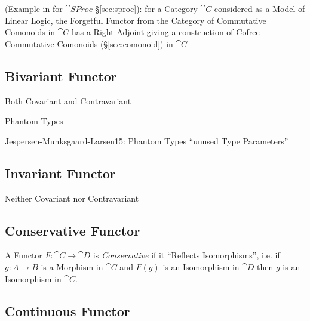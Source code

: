 (Example in \cite{abramsky-gay-nagarajan96} for $\cat{SProc}$
\S\ref{sec:sproc}): for a Category $\cat{C}$ considered as a Model of
Linear Logic, the Forgetful Functor from the Category of Commutative
Comonoids in $\cat{C}$ has a Right Adjoint giving a construction of
Cofree Commutative Comonoids (\S\ref{sec:comonoid}) in $\cat{C}$



\subsection{Bivariant Functor} \label{sec:bivariant_functor}

Both Covariant and Contravariant

Phantom Types %

Jespersen-Munksgaard-Larsen15: Phantom Types ``unused Type
Parameters''



\subsection{Invariant Functor} \label{sec:invariant_functor}

Neither Covariant nor Contravariant



\subsection{Conservative Functor}\label{sec:conservative_functor}

A Functor $F : \cat{C} \rightarrow \cat{D}$ is
\emph{Conservative} if it ``Reflects Isomorphisms'', i.e. if $g : A
\rightarrow B$ is a Morphism in $\cat{C}$ and $F(g)$ is an
Isomorphism in $\cat{D}$ then $g$ is an Isomorphism in
$\cat{C}$.



\subsection{Continuous Functor}\label{sec:continuous_functor}

